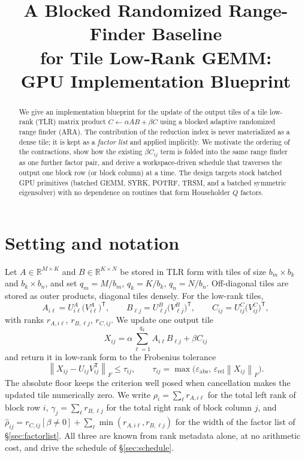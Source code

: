 \documentclass[11pt]{article}
\title{A Blocked Randomized Range-Finder Baseline\\
for Tile Low-Rank GEMM:\\
GPU Implementation Blueprint}
\author{}
\date{}
\newcommand{\R}{\mathbb{R}}
\newcommand{\T}{\mathsf{T}}
\newcommand{\Fnorm}[1]{\left\|#1\right\|_F}
\begin{document}
\maketitle

\begin{abstract}
We give an implementation blueprint for the update of the output tiles of a tile
low-rank (TLR) matrix product $C\leftarrow\alpha AB+\beta C$ using a blocked
adaptive randomized range finder (ARA). The contribution of the reduction index
is never materialized as a dense tile; it is kept as a \emph{factor list} and
applied implicitly. We motivate the ordering of the contractions, show how the
existing $\beta C_{ij}$ term is folded into the same range finder as one further
factor pair, and derive a workspace-driven schedule that traverses the output
one block row (or block column) at a time. The design targets stock batched
GPU primitives (batched GEMM, SYRK, POTRF, TRSM, and a batched symmetric
eigensolver) with no dependence on routines that form Householder $Q$ factors.
\end{abstract}

\tableofcontents

\section{Setting and notation}
\label{sec:setting}

Let $A\in\R^{M\times K}$ and $B\in\R^{K\times N}$ be stored in TLR form with
tiles of size $b_m\times b_k$ and $b_k\times b_n$, and set $q_m=M/b_m$,
$q_k=K/b_k$, $q_n=N/b_n$. Off-diagonal tiles are stored as outer products,
diagonal tiles densely. For the low-rank tiles,
\[
A_{i\ell}=U^A_{i\ell}\bigl(V^A_{i\ell}\bigr)^{\T},
\qquad
B_{\ell j}=U^B_{\ell j}\bigl(V^B_{\ell j}\bigr)^{\T},
\qquad
C_{ij}=U^C_{ij}\bigl(V^C_{ij}\bigr)^{\T},
\]
with ranks $r_{A,i\ell}$, $r_{B,\ell j}$, $r_{C,ij}$. We update one output tile
\begin{equation}
\label{eq:update}
X_{ij}=\alpha\sum_{\ell=1}^{q_k}A_{i\ell}B_{\ell j}+\beta C_{ij}
\end{equation}
and return it in low-rank form to the Frobenius tolerance
\begin{equation}
\label{eq:tol}
\Fnorm{X_{ij}-U_{ij}V_{ij}^{\T}}\le\tau_{ij},
\qquad
\tau_{ij}=\max\bigl(\varepsilon_{\mathrm{abs}},\,
\varepsilon_{\mathrm{rel}}\Fnorm{X_{ij}}\bigr).
\end{equation}
The absolute floor keeps the criterion well posed when cancellation makes the
updated tile numerically zero. We write
$\rho_i=\sum_\ell r_{A,i\ell}$ for the total left rank of block row $i$,
$\gamma_j=\sum_\ell r_{B,\ell j}$ for the total right rank of block column $j$,
and
$\hat\rho_{ij}=r_{C,ij}[\beta\ne0]+\sum_\ell\min(r_{A,i\ell},r_{B,\ell j})$
for the width of the factor list of \S\ref{sec:factorlist}. All three are known
from rank metadata alone, at no arithmetic cost, and drive the schedule of
\S\ref{sec:schedule}.
\end{document}
